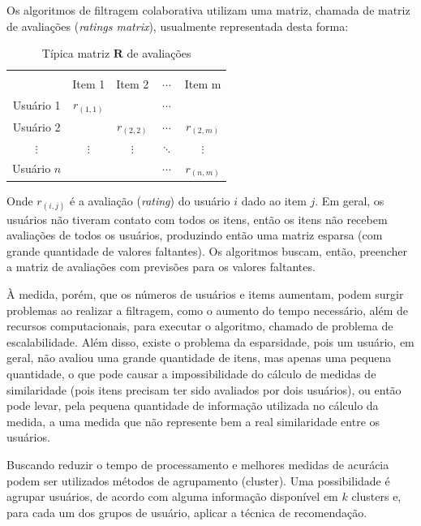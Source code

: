 \documentclass[12pt,a4paper,header]{abnt}
\begin{document}
Os algoritmos de filtragem colaborativa utilizam uma matriz, chamada de matriz de avaliações (\textit{ratings matrix}), usualmente representada desta forma:

\begin{table}[!h]
\centering
\caption{Típica matriz $\mathbf{R}$ de avaliações}
\label{rating_matrix}
\begin{tabular}{c|c|c|c|c}
\hline \\
            & Item 1      & Item 2      & $\cdots$ & Item m      \\
Usuário 1   & $r_{(1, 1)}$ &             & $\cdots$  &             \\
Usuário 2   &  & $r_{(2, 2)}$ & $\cdots$ & $r_{(2, m)}$ \\
$\vdots$       &    $\vdots$  & $\vdots$       &  $\ddots$ & $\vdots$ \\
Usuário $n$ &  &             & $\cdots$ & $r_{(n, m)}$ \\
\hline
\end{tabular}
\end{table}

Onde $r_{(i, j)}$ é a avaliação (\textit{rating}) do usuário $i$ dado ao item $j$. Em geral, os usuários não tiveram contato com todos os itens, então os itens não recebem avaliações de todos os usuários, produzindo então uma matriz esparsa (com grande quantidade de valores faltantes). Os algoritmos buscam, então, preencher a matriz de avaliações com previsões para os valores faltantes.

À medida, porém, que os números de usuários e items aumentam, podem surgir problemas ao realizar a filtragem, como o aumento do tempo necessário, além de recursos computacionais, para executar o algoritmo, chamado de problema de escalabilidade\cite{dakhel2011new}. Além disso, existe o problema da esparsidade, pois um usuário, em geral, não avaliou uma grande quantidade de itens, mas apenas uma pequena quantidade, o que pode causar a impossibilidade do cálculo de medidas de similaridade (pois itens precisam ter sido avaliados por dois usuários), ou então pode levar, pela pequena quantidade de informação utilizada no cálculo da medida, a uma medida que não represente bem a real similaridade entre os usuários\cite{dakhel2011new}.

Buscando reduzir o tempo de processamento e melhores medidas de acurácia podem ser utilizados métodos de agrupamento (cluster)\cite{o1999clustering}. Uma possibilidade é agrupar usuários, de acordo com alguma informação disponível em $k$ clusters e, para cada um dos grupos de usuário, aplicar a técnica de recomendação.  
\end{document}
